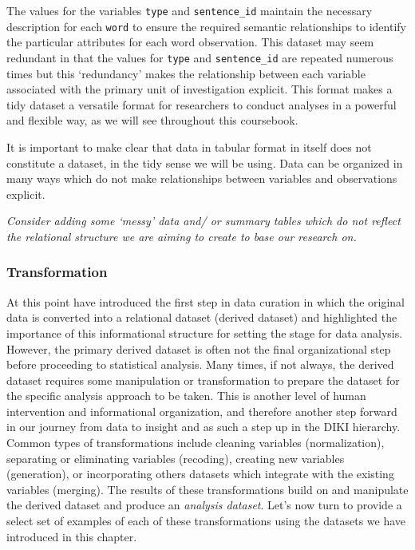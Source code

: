 \documentclass[
]{article}
\begin{document}
The values for the variables \texttt{type} and \texttt{sentence\_id} maintain the necessary description for each \texttt{word} to ensure the required semantic relationships to identify the particular attributes for each word observation. This dataset may seem redundant in that the values for \texttt{type} and \texttt{sentence\_id} are repeated numerous times but this `redundancy' makes the relationship between each variable associated with the primary unit of investigation explicit. This format makes a tidy dataset a versatile format for researchers to conduct analyses in a powerful and flexible way, as we will see throughout this coursebook.

It is important to make clear that data in tabular format in itself does not constitute a dataset, in the tidy sense we will be using. Data can be organized in many ways which do not make relationships between variables and observations explicit.

\emph{Consider adding some `messy' data and/ or summary tables which do not reflect the relational structure we are aiming to create to base our research on.}

\hypertarget{transformation}{%
\subsubsection{Transformation}\label{transformation}}

At this point have introduced the first step in data curation in which the original data is converted into a relational dataset (derived dataset) and highlighted the importance of this informational structure for setting the stage for data analysis. However, the primary derived dataset is often not the final organizational step before proceeding to statistical analysis. Many times, if not always, the derived dataset requires some manipulation or transformation to prepare the dataset for the specific analysis approach to be taken. This is another level of human intervention and informational organization, and therefore another step forward in our journey from data to insight and as such a step up in the DIKI hierarchy. Common types of transformations include cleaning variables (normalization), separating or eliminating variables (recoding), creating new variables (generation), or incorporating others datasets which integrate with the existing variables (merging). The results of these transformations build on and manipulate the derived dataset and produce an \emph{analysis dataset}. Let's now turn to provide a select set of examples of each of these transformations using the datasets we have introduced in this chapter.
\end{document}
